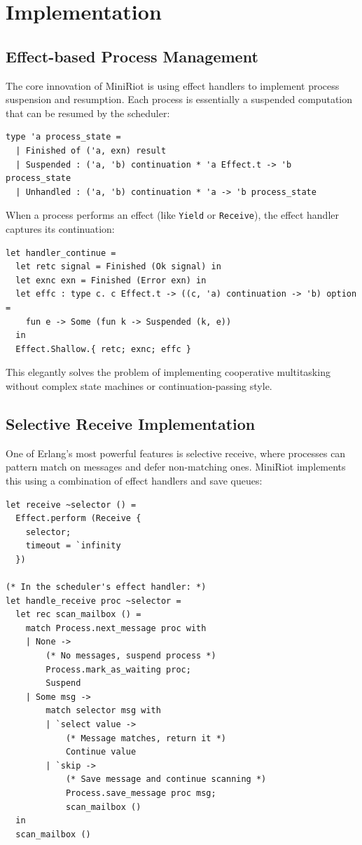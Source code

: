 \documentclass[sigplan,screen]{acmart}
\begin{document}
\section{Implementation}

\subsection{Effect-based Process Management}

The core innovation of MiniRiot is using effect handlers to implement process suspension and resumption. Each process is essentially a suspended computation that can be resumed by the scheduler:

\begin{lstlisting}
type 'a process_state =
  | Finished of ('a, exn) result
  | Suspended : ('a, 'b) continuation * 'a Effect.t -> 'b process_state
  | Unhandled : ('a, 'b) continuation * 'a -> 'b process_state
\end{lstlisting}

When a process performs an effect (like \texttt{Yield} or \texttt{Receive}), the effect handler captures its continuation:

\begin{lstlisting}
let handler_continue =
  let retc signal = Finished (Ok signal) in
  let exnc exn = Finished (Error exn) in
  let effc : type c. c Effect.t -> ((c, 'a) continuation -> 'b) option =
    fun e -> Some (fun k -> Suspended (k, e))
  in
  Effect.Shallow.{ retc; exnc; effc }
\end{lstlisting}

This elegantly solves the problem of implementing cooperative multitasking without complex state machines or continuation-passing style.

\subsection{Selective Receive Implementation}

One of Erlang's most powerful features is selective receive, where processes can pattern match on messages and defer non-matching ones. MiniRiot implements this using a combination of effect handlers and save queues:

\begin{lstlisting}
let receive ~selector () =
  Effect.perform (Receive { 
    selector; 
    timeout = `infinity 
  })

(* In the scheduler's effect handler: *)
let handle_receive proc ~selector =
  let rec scan_mailbox () =
    match Process.next_message proc with
    | None -> 
        (* No messages, suspend process *)
        Process.mark_as_waiting proc;
        Suspend
    | Some msg ->
        match selector msg with
        | `select value -> 
            (* Message matches, return it *)
            Continue value
        | `skip ->
            (* Save message and continue scanning *)
            Process.save_message proc msg;
            scan_mailbox ()
  in
  scan_mailbox ()
\end{lstlisting}
\end{document}
